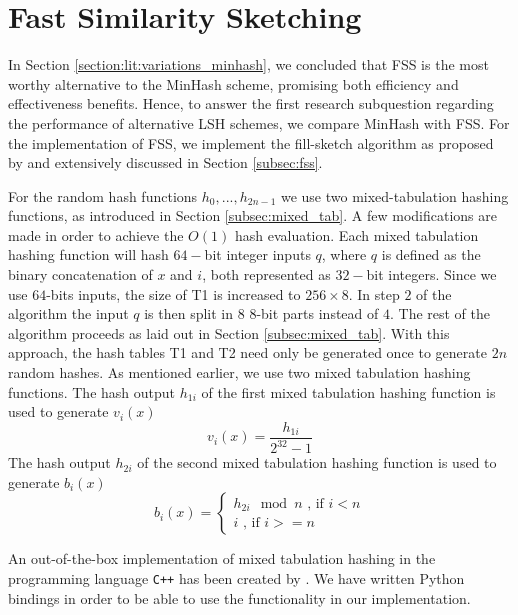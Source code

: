 \section{Fast Similarity Sketching}
\label{section:fss}
In Section \ref{section:lit:variations_minhash}, we concluded that FSS is the most worthy alternative to the MinHash scheme, promising both efficiency and effectiveness benefits. Hence, to answer the first research subquestion regarding the performance of alternative LSH schemes, we compare MinHash with FSS. For the implementation of FSS, we implement the fill-sketch algorithm as proposed by \cite{DahlgaardKT17} and extensively discussed in Section \ref{subsec:fss}.

For the random hash functions $h_0,...,h_{2n-1}$ we use two mixed-tabulation hashing functions, as introduced in Section \ref{subsec:mixed_tab}. A few modifications are made in order to achieve the $O(1)$ hash evaluation. Each mixed tabulation hashing function will hash $64-$bit integer inputs $q$, where $q$ is defined as the binary concatenation of $x$ and $i$, both represented as $32-$bit integers. Since we use $64$-bits inputs, the size of T1 is increased to $256 \times 8$. In step $2$ of the algorithm the input $q$ is then split in $8$ $8$-bit parts instead of $4$. The rest of the algorithm proceeds as laid out in Section \ref{subsec:mixed_tab}. With this approach, the hash tables T1 and T2 need only be generated once to generate $2n$ random hashes. As mentioned earlier, we use two mixed tabulation hashing functions. The hash output $h_{1i}$ of the first mixed tabulation hashing function is used to generate $v_i(x)$
\begin{equation}
    v_i(x) = \frac{h_{1i}}{2^{32} - 1}
\end{equation}
The hash output $h_{2i}$ of the second mixed tabulation hashing function is used to generate $b_i(x)$
\begin{equation}
    b_i(x) = \begin{cases} h_{2i} \mod n \text{          , if  } i<n\\
        i \text{         , if  } i>= n
    \end{cases}
\end{equation}

An out-of-the-box implementation of mixed tabulation hashing in the programming language \verb!C++! has been created by \cite{mixedTabimplementDahlgaard}. We have written Python bindings in order to be able to use the functionality in our implementation. 

